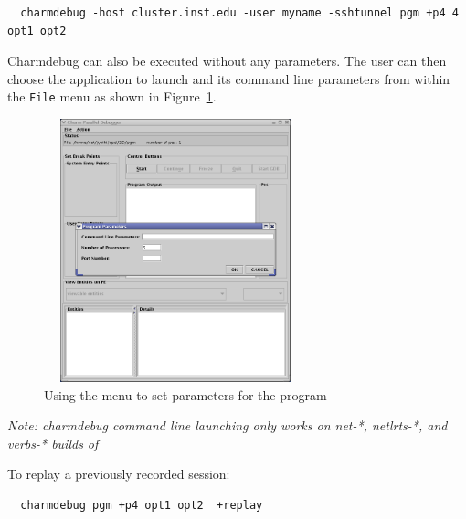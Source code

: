 \documentclass[10pt]{article}
\begin{document}
\begin{verbatim}
  charmdebug -host cluster.inst.edu -user myname -sshtunnel pgm +p4 4 opt1 opt2
\end{verbatim}

Charmdebug can also be executed without any parameters.  The user can
then choose the application to launch and its command line parameters
from within the \texttt{File} menu as shown in Figure~\ref{menu}.

\begin{figure}[]
\includegraphics[scale=0.5, height=3in, width=3in]{figs/menu}
\caption{Using the menu to set parameters for the \charmpp{} program}
\label{menu}
\end{figure}


\emph{Note: charmdebug command line launching only works on net-*, netlrts-*, and verbs-*
builds of \charmpp{} }

To replay a previously recorded session:

\begin{verbatim}
  charmdebug pgm +p4 opt1 opt2  +replay
\end{verbatim}




\end{document}

